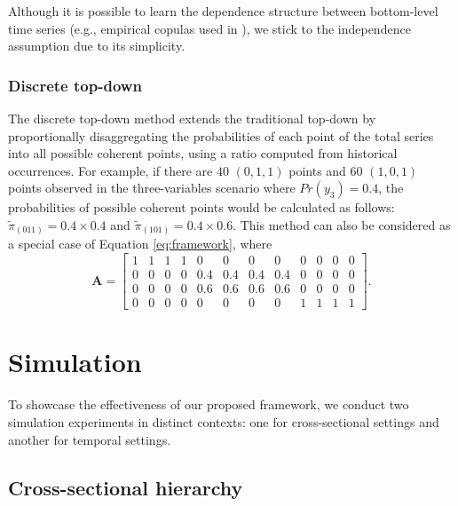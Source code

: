 \documentclass[a4paper,review,12pt,authoryear]{elsarticle}
\theoremstyle{definition}
\begin{document}
    Although it is possible to learn the dependence structure between bottom-level time series (e.g., empirical copulas used in \citealp{bentaiebHierarchicalProbabilisticForecasting2020}), we stick to the independence assumption due to its simplicity.

    \subsubsection*{\textbf{Discrete top-down}}

    The discrete top-down method extends the traditional top-down by proportionally disaggregating the probabilities of each point of the total series into all possible coherent points, using a ratio computed from historical occurrences.
    For example, if there are $40$ $(0, 1, 1)$ points and $60$ $(1, 0, 1) $ points observed in the three-variables scenario where $Pr(y_3) = 0.4$, the probabilities of possible coherent points would be calculated as follows: $\tilde \pi_{(011)} = 0.4\times 0.4$ and $\tilde \pi_{(101)} = 0.4\times 0.6$.
    This method can also be considered as a special case of Equation \eqref{eq:framework}, where
    \[
    \mathbf{A} = \left[\begin{matrix}
      1 & 1 & 1 & 1 & 0 & 0 & 0 & 0 & 0 & 0 & 0 & 0 \\
      0 & 0 & 0 & 0 & 0.4 & 0.4 & 0.4 & 0.4 & 0 & 0 & 0 & 0 \\
      0 & 0 & 0 & 0 & 0.6 & 0.6 & 0.6 & 0.6 & 0 & 0 & 0 & 0 \\
      0 & 0 & 0 & 0 & 0 & 0 & 0 & 0 & 1 & 1 & 1 & 1
    \end{matrix}\right].
    \]

\section{Simulation}
\label{sec:simulation}

To showcase the effectiveness of our proposed framework, we conduct two simulation experiments in distinct contexts: one for cross-sectional settings and another for temporal settings.

  \subsection{Cross-sectional hierarchy}
  \label{sec:cross-sectional_simu}
\end{document}
